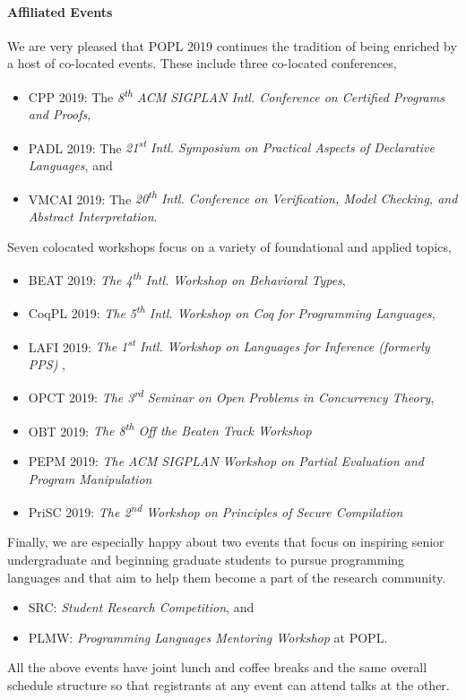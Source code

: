 \paragraph{Affiliated Events}
%
We are very pleased that POPL 2019 continues the tradition of being enriched
by a host of co-located events.
%
These include three co-located conferences,
%
\begin{itemize}
  \item CPP 2019:   The \emph{8\textsuperscript{th} ACM SIGPLAN Intl. Conference on Certified Programs and Proofs},
  \item PADL 2019:  The \emph{21\textsuperscript{st} Intl. Symposium on Practical Aspects of Declarative Languages}, and
  \item VMCAI 2019: The \emph{20\textsuperscript{th} Intl. Conference on Verification, Model Checking, and Abstract Interpretation}.
\end{itemize}
%
Seven colocated workshops focus on a variety of foundational and applied topics,
%
\begin{itemize}
  \item BEAT 2019: \emph{The 4\textsuperscript{th} Intl. Workshop on Behavioral Types},
  \item CoqPL 2019: \emph{The 5\textsuperscript{th} Intl. Workshop on Coq for Programming Languages},
  \item LAFI 2019: \emph{The 1\textsuperscript{st} Intl. Workshop on Languages for Inference (formerly PPS) },
  \item OPCT 2019:   \emph{The 3\textsuperscript{rd} Seminar on Open Problems in Concurrency Theory},
  \item OBT 2019:   \emph{The 8\textsuperscript{th} Off the Beaten Track Workshop}
  \item PEPM 2019:  \emph{The ACM SIGPLAN Workshop on Partial Evaluation and Program Manipulation}
  \item PriSC 2019: \emph{The 2\textsuperscript{nd} Workshop on Principles of Secure Compilation}
\end{itemize}
%
Finally, we are especially happy about two events that
focus on inspiring senior undergraduate and beginning
graduate students to pursue programming languages and
that aim to help them become a part of the research
community.
%
\begin{itemize}
\item SRC: \emph{Student Research Competition}, and
\item PLMW: \emph{Programming Languages Mentoring Workshop} at POPL.
\end{itemize}
%
All the above events have joint lunch and coffee breaks
and the same overall schedule structure so that registrants
at any event can attend talks at the other.

